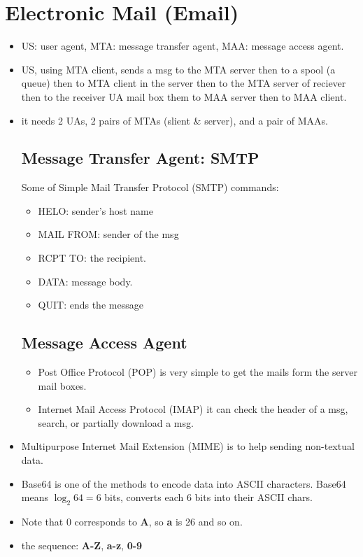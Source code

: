 \documentclass{article}
\begin{document}
\section{Electronic Mail (Email)}%
\label{sec:Email}

\begin{itemize}
  \item US: user agent, MTA: message transfer agent, MAA: message access agent.
  \item US, using MTA client, sends a msg to the MTA server then to a spool (a queue)
        then to MTA client in the server then to the MTA server of reciever then to
        the receiver UA mail box them to MAA server then to MAA client.
  \item it needs 2 UAs, 2 pairs of MTAs (slient \& server), and a pair of MAAs.

\subsection{Message Transfer Agent: SMTP}%
        \label{subsec:SMTP}

        Some of Simple Mail Transfer Protocol (SMTP) commands:
        \begin{itemize}
          \item HELO: sender's host name
          \item MAIL FROM: sender of the msg
          \item RCPT TO: the recipient.
          \item DATA: message body.
          \item QUIT: ends the message
        \end{itemize}

\subsection{Message Access Agent}%
\label{subsec:MAA}
\begin{itemize}
  \item Post Office Protocol (POP) is very simple to get the mails form the server mail boxes.
  \item Internet Mail Access Protocol (IMAP) it can check the header of a msg, search, or partially
        download a msg.
\end{itemize}
  \item Multipurpose Internet Mail Extension (MIME) is to help sending non-textual data.
  \item Base64 is one of the methods to encode data into ASCII characters.
        Base64 means $\log_{2}64=6$ bits, converts each 6 bits into their ASCII chars.
  \item Note that 0 corresponds to \textbf{A}, so \textbf{a} is 26 and so on.
  \item the sequence: \textbf{A-Z}, \textbf{a-z}, \textbf{0-9}
\end{itemize}
\end{document}
